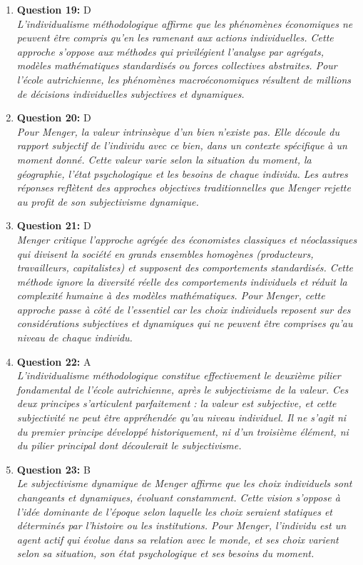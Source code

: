 \documentclass[12pt,a4paper]{article}
\begin{document}
\begin{enumerate}
\item \textbf{Question 19:} D
\\ \textit{L'individualisme méthodologique affirme que les phénomènes économiques ne peuvent être compris qu'en les ramenant aux actions individuelles. Cette approche s'oppose aux méthodes qui privilégient l'analyse par agrégats, modèles mathématiques standardisés ou forces collectives abstraites. Pour l'école autrichienne, les phénomènes macroéconomiques résultent de millions de décisions individuelles subjectives et dynamiques.}

\item \textbf{Question 20:} D
\\ \textit{Pour Menger, la valeur intrinsèque d'un bien n'existe pas. Elle découle du rapport subjectif de l'individu avec ce bien, dans un contexte spécifique à un moment donné. Cette valeur varie selon la situation du moment, la géographie, l'état psychologique et les besoins de chaque individu. Les autres réponses reflètent des approches objectives traditionnelles que Menger rejette au profit de son subjectivisme dynamique.}

\item \textbf{Question 21:} D
\\ \textit{Menger critique l'approche agrégée des économistes classiques et néoclassiques qui divisent la société en grands ensembles homogènes (producteurs, travailleurs, capitalistes) et supposent des comportements standardisés. Cette méthode ignore la diversité réelle des comportements individuels et réduit la complexité humaine à des modèles mathématiques. Pour Menger, cette approche passe à côté de l'essentiel car les choix individuels reposent sur des considérations subjectives et dynamiques qui ne peuvent être comprises qu'au niveau de chaque individu.}

\item \textbf{Question 22:} A
\\ \textit{L'individualisme méthodologique constitue effectivement le deuxième pilier fondamental de l'école autrichienne, après le subjectivisme de la valeur. Ces deux principes s'articulent parfaitement : la valeur est subjective, et cette subjectivité ne peut être appréhendée qu'au niveau individuel. Il ne s'agit ni du premier principe développé historiquement, ni d'un troisième élément, ni du pilier principal dont découlerait le subjectivisme.}

\item \textbf{Question 23:} B
\\ \textit{Le subjectivisme dynamique de Menger affirme que les choix individuels sont changeants et dynamiques, évoluant constamment. Cette vision s'oppose à l'idée dominante de l'époque selon laquelle les choix seraient statiques et déterminés par l'histoire ou les institutions. Pour Menger, l'individu est un agent actif qui évolue dans sa relation avec le monde, et ses choix varient selon sa situation, son état psychologique et ses besoins du moment.}


\end{enumerate}
\end{document}
